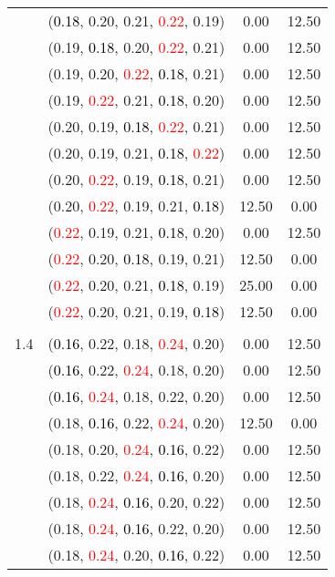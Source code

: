 \documentclass[10pt,a4paper]{report}
\begin{document}
\begin{center}
\begin{longtable}{clcc}
			&(\textcolor{black}{0.18}, 0.20, 0.21, \textcolor{red}{0.22}, 0.19)&0.00&12.50\\
			&(0.19, \textcolor{black}{0.18}, 0.20, \textcolor{red}{0.22}, 0.21)&0.00&12.50\\
			&(0.19, 0.20, \textcolor{red}{0.22}, \textcolor{black}{0.18}, 0.21)&0.00&12.50\\
			&(0.19, \textcolor{red}{0.22}, 0.21, \textcolor{black}{0.18}, 0.20)&0.00&12.50\\
			&(0.20, 0.19, \textcolor{black}{0.18}, \textcolor{red}{0.22}, 0.21)&0.00&12.50\\
			&(0.20, 0.19, 0.21, \textcolor{black}{0.18}, \textcolor{red}{0.22})&0.00&12.50\\
			&(0.20, \textcolor{red}{0.22}, 0.19, \textcolor{black}{0.18}, 0.21)&0.00&12.50\\
			&(0.20, \textcolor{red}{0.22}, 0.19, 0.21, \textcolor{black}{0.18})&12.50&0.00\\
			&(\textcolor{red}{0.22}, 0.19, 0.21, \textcolor{black}{0.18}, 0.20)&0.00&12.50\\
			&(\textcolor{red}{0.22}, 0.20, \textcolor{black}{0.18}, 0.19, 0.21)&12.50&0.00\\
			&(\textcolor{red}{0.22}, 0.20, 0.21, \textcolor{black}{0.18}, 0.19)&25.00&0.00\\
			&(\textcolor{red}{0.22}, 0.20, 0.21, 0.19, \textcolor{black}{0.18})&12.50&0.00\\
		&&&\\
		1.4			&(\textcolor{black}{0.16}, 0.22, 0.18, \textcolor{red}{0.24}, 0.20)&0.00&12.50\\
			&(\textcolor{black}{0.16}, 0.22, \textcolor{red}{0.24}, 0.18, 0.20)&0.00&12.50\\
			&(\textcolor{black}{0.16}, \textcolor{red}{0.24}, 0.18, 0.22, 0.20)&0.00&12.50\\
			&(0.18, \textcolor{black}{0.16}, 0.22, \textcolor{red}{0.24}, 0.20)&12.50&0.00\\
			&(0.18, 0.20, \textcolor{red}{0.24}, \textcolor{black}{0.16}, 0.22)&0.00&12.50\\
			&(0.18, 0.22, \textcolor{red}{0.24}, \textcolor{black}{0.16}, 0.20)&0.00&12.50\\
			&(0.18, \textcolor{red}{0.24}, \textcolor{black}{0.16}, 0.20, 0.22)&0.00&12.50\\
			&(0.18, \textcolor{red}{0.24}, \textcolor{black}{0.16}, 0.22, 0.20)&0.00&12.50\\
			&(0.18, \textcolor{red}{0.24}, 0.20, \textcolor{black}{0.16}, 0.22)&0.00&12.50\\

\end{longtable}
\end{center}
\end{document}
